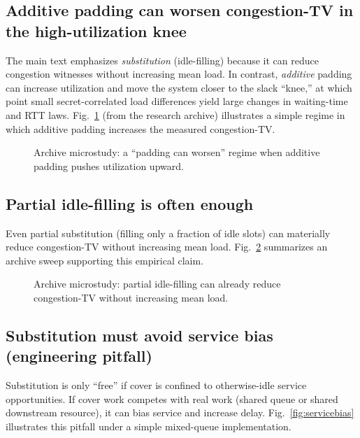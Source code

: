 \documentclass[11pt]{article}
\theoremstyle{definition}
\theoremstyle{remark}
\begin{document}
\subsection{Additive padding can worsen congestion-TV in the high-utilization knee}
The main text emphasizes \emph{substitution} (idle-filling) because it can reduce congestion witnesses without increasing mean load.
In contrast, \emph{additive} padding can increase utilization and move the system closer to the slack ``knee,''
at which point small secret-correlated load differences yield large changes in waiting-time and RTT laws.
Fig.~\ref{fig:worsens} (from the research archive) illustrates a simple regime in which additive padding increases the measured congestion-TV.

\begin{figure}[t]
\centering
{}
\caption{Archive microstudy: a ``padding can worsen'' regime when additive padding pushes utilization upward.}
\label{fig:worsens}
\end{figure}

\subsection{Partial idle-filling is often enough}
Even partial substitution (filling only a fraction of idle slots) can materially reduce congestion-TV without increasing mean load.
Fig.~\ref{fig:idle} summarizes an archive sweep supporting this empirical claim.

\begin{figure}[t]
\centering
{}
\caption{Archive microstudy: partial idle-filling can already reduce congestion-TV without increasing mean load.}
\label{fig:idle}
\end{figure}

\subsection{Substitution must avoid service bias (engineering pitfall)}
Substitution is only ``free'' if cover is confined to otherwise-idle service opportunities.
If cover work competes with real work (shared queue or shared downstream resource), it can bias service and increase delay.
Fig.~\ref{fig:servicebias} illustrates this pitfall under a simple mixed-queue implementation.
\end{document}
